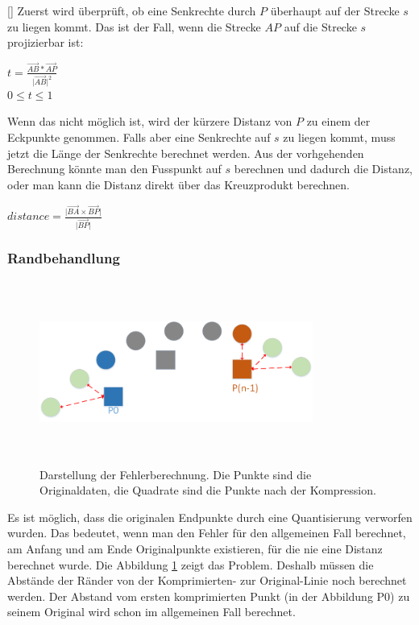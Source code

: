 [\baselineskip]
Zuerst wird überprüft, ob eine Senkrechte durch $P$ überhaupt auf der Strecke $s$ zu liegen kommt. Das ist der Fall, wenn die Strecke $AP$ auf die Strecke $s$ projizierbar ist:
\begin{center}
$ t = \frac{\vec{AB}*\vec{AP}}{\lvert \vec{AB}\rvert ^2}$\\
  $0 \leq t \leq 1$
\end{center}
Wenn das nicht möglich ist, wird der kürzere Distanz von $P$ zu einem der Eckpunkte genommen. Falls aber eine Senkrechte auf $s$ zu liegen kommt, muss jetzt die Länge der Senkrechte berechnet werden. Aus der vorhgehenden Berechnung könnte man den Fusspunkt auf $s$ berechnen und dadurch die Distanz, oder man kann die Distanz direkt über das Kreuzprodukt berechnen.
\begin{center}
  $distance = \frac{\lvert \vec{BA}\times \vec{BP}\rvert}{\lvert \vec{BP} \rvert}$
\end{center}

\subsubsection{Randbehandlung}
\begin{figure}[!htbp]
	\center
	\includegraphics[width=0.8\textwidth,height=6cm,keepaspectratio]{./pictures/testsetup/randbehandlung.png}
	\caption{Darstellung der Fehlerberechnung. Die Punkte sind die Originaldaten, die Quadrate sind die Punkte nach der Kompression.}
	\label{testsetup:ablauf:randbehandlung:diagramm}
\end{figure}
Es ist möglich, dass die originalen Endpunkte durch eine Quantisierung verworfen wurden. Das bedeutet, wenn man den Fehler für den allgemeinen Fall berechnet, am Anfang und am Ende Originalpunkte existieren, für die nie eine Distanz berechnet wurde. Die Abbildung \ref{testsetup:ablauf:randbehandlung:diagramm} zeigt das Problem. Deshalb müssen die Abstände der Ränder von der Komprimierten- zur Original-Linie noch berechnet werden. Der Abstand vom ersten komprimierten Punkt (in der Abbildung P0) zu seinem Original wird schon im allgemeinen Fall berechnet.

